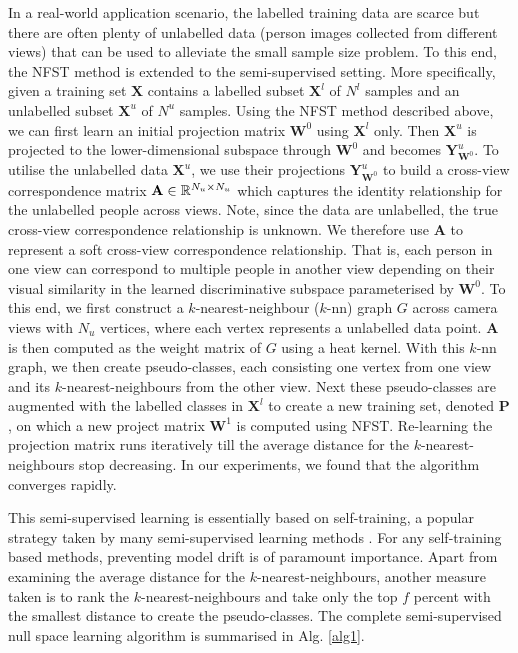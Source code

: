 \documentclass[10pt,twocolumn,letterpaper]{article}
\begin{document}
In a real-world application scenario, the labelled training data are scarce but there are often plenty of unlabelled data (person images collected from different views) that can be used to alleviate the small sample size problem. To this end, the   NFST method is extended to the semi-supervised setting. More specifically, given a training set $\mathbf{X}$ contains a labelled subset $\mathbf{X}^l$ of $N^l$ samples  and an unlabelled subset $\mathbf{X}^u$ of $N^u$ samples. Using the NFST method described above, we can first learn an initial projection matrix $\mathbf{W}^0$ using $\mathbf{X}^l$ only. Then $\mathbf{X}^u$ is projected to the lower-dimensional subspace through $\mathbf{W}^0$ and becomes $\mathbf{Y}^u_{\mathbf{W}^0}$. To utilise the unlabelled data $\mathbf{X}^u$, we use their projections $\mathbf{Y}^u_{\mathbf{W}^0}$ to build a cross-view correspondence matrix $\mathbf{A} \in
\Bbb{R}^{N_u \times N_u}$ which
captures the identity relationship for the unlabelled people across views. Note, since the  data are unlabelled, the
true cross-view correspondence relationship is unknown. We therefore
use $\mathbf{A}$ to represent a soft cross-view correspondence relationship. That
is, each person in one view can correspond to multiple people in another view depending
on their visual similarity in the learned discriminative subspace parameterised by $\mathbf{W}^0$.   To this end, we first
construct a $k$-nearest-neighbour ($k$-nn) graph $G$ across camera views with $N_u$
vertices, where each vertex represents a unlabelled data point.  $\mathbf{A}$  is then
computed as the weight matrix of $G$ using a heat kernel. With this $k$-nn graph, we then create pseudo-classes, each consisting one vertex from one view and its $k$-nearest-neighbours from the other view. Next these pseudo-classes are augmented with the labelled classes in $\mathbf{X}^l$ to create a new training set, denoted $\mathbf{P}$, on which a new project matrix  $\mathbf{W}^1$ is computed using NFST. 
Re-learning the projection matrix runs iteratively till the average distance for the $k$-nearest-neighbours stop decreasing. In our experiments, we found that the algorithm converges rapidly. 

This semi-supervised learning is essentially based on self-training, a popular strategy taken by many semi-supervised learning methods \cite{zhu2005semi}. For any self-training based methods, preventing model drift is of paramount importance. Apart from  examining the average distance for the $k$-nearest-neighbours, another measure taken is to rank the $k$-nearest-neighbours and take only the top $f$ percent with the smallest distance to create the pseudo-classes. The complete semi-supervised null space learning algorithm is summarised in Alg. \ref{alg1}.
\end{document}
